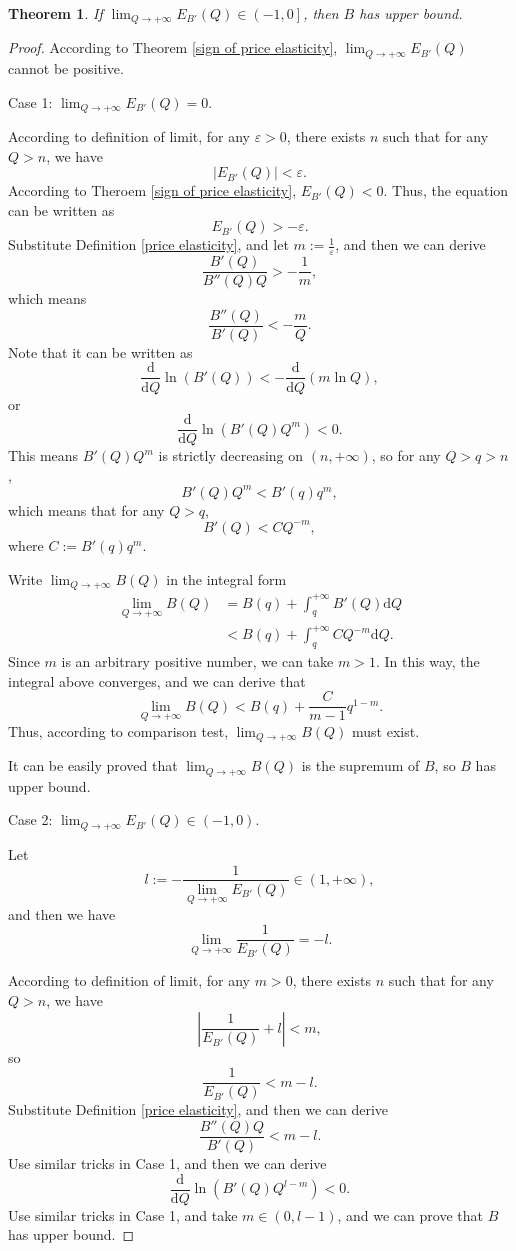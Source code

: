 \documentclass{article}
\newtheorem{theorem}{Theorem}
\begin{document}
\begin{theorem}
\label{upper bound of benefit}
If $\lim_{Q\to+\infty}E_{B'}\left(Q\right)\in\left(-1,0\right]$, then $B$ has upper bound.
\end{theorem}
\begin{proof}
According to Theorem \ref{sign of price elasticity},
$\lim_{Q\to+\infty}E_{B'}\left(Q\right)$ cannot be positive.

Case 1: $\lim_{Q\to+\infty}E_{B'}\left(Q\right)=0$.

According to definition of limit, for any $\varepsilon>0$, there exists $n$ such that for any $Q>n$, we have
$$\left|E_{B'}\left(Q\right)\right|<\varepsilon.$$
According to Theroem \ref{sign of price elasticity}, $E_{B'}\left(Q\right)<0$.
Thus, the equation can be written as
$$E_{B'}\left(Q\right)>-\varepsilon.$$
Substitute Definition \ref{price elasticity}, and let $m:=\frac1\varepsilon$, and then we can derive
$$\frac{B'\left(Q\right)}{B''\left(Q\right)Q}>-\frac1m,$$
which means
$$\frac{B''\left(Q\right)}{B'\left(Q\right)}<-\frac mQ.$$
Note that it can be written as
$$\frac{\mathrm d}{\mathrm dQ}\ln\left(B'\left(Q\right)\right)<-\frac{\mathrm d}{\mathrm dQ}\left(m\ln Q\right),$$
or
$$\frac{\mathrm d}{\mathrm dQ}\ln\left(B'\left(Q\right)Q^m\right)<0.$$
This means $B'\left(Q\right)Q^m$ is strictly decreasing on $\left(n,+\infty\right)$,
so for any $Q>q>n$,
$$B'\left(Q\right)Q^m<B'\left(q\right)q^m,$$
which means that for any $Q>q$,
$$B'\left(Q\right)<CQ^{-m},$$
where $C:=B'\left(q\right)q^m$.

Write $\lim_{Q\to+\infty}B\left(Q\right)$ in the integral form
\begin{align*}
\lim_{Q\to+\infty}B\left(Q\right)&=B\left(q\right)+\int_q^{+\infty}B'\left(Q\right)\mathrm dQ\\
&<B\left(q\right)+\int_q^{+\infty}CQ^{-m}\mathrm dQ.
\end{align*}
Since $m$ is an arbitrary positive number, we can take $m>1$.
In this way, the integral above converges, and we can derive that
$$\lim_{Q\to+\infty}B\left(Q\right)<B\left(q\right)+\frac C{m-1}q^{1-m}.$$
Thus, according to comparison test, $\lim_{Q\to+\infty}B\left(Q\right)$ must exist.

It can be easily proved that $\lim_{Q\to+\infty}B\left(Q\right)$ is the supremum of $B$, so $B$ has upper bound.

Case 2: $\lim_{Q\to+\infty}E_{B'}\left(Q\right)\in\left(-1,0\right)$.

Let
$$l:=-\frac1{\lim_{Q\to+\infty}E_{B'}\left(Q\right)}\in\left(1,+\infty\right),$$
and then we have
$$\lim_{Q\to+\infty}\frac1{E_{B'}\left(Q\right)}=-l.$$

According to definition of limit, for any $m>0$, there exists $n$ such that for any $Q>n$, we have
$$\left|\frac1{E_{B'}\left(Q\right)}+l\right|<m,$$
so
$$\frac1{E_{B'}\left(Q\right)}<m-l.$$
Substitute Definition \ref{price elasticity}, and then we can derive
$$\frac{B''\left(Q\right)Q}{B'\left(Q\right)}<m-l.$$
Use similar tricks in Case 1, and then we can derive
$$\frac{\mathrm d}{\mathrm dQ}\ln\left(B'\left(Q\right)Q^{l-m}\right)<0.$$
Use similar tricks in Case 1, and take $m\in\left(0,l-1\right)$,
and we can prove that $B$ has upper bound.
\end{proof}
\end{document}
